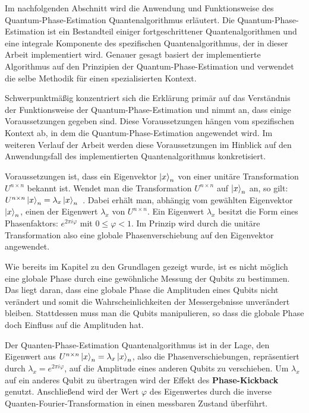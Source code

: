 Im nachfolgenden Abschnitt wird die Anwendung und Funktionsweise des Quantum-Phase-Estimation Quantenalgorithmus erläutert. 
Die Quantum-Phase-Estimation ist ein Bestandteil einiger fortgeschrittener Quantenalgorithmen und eine integrale Komponente des spezifischen Quantenalgorithmus, 
der in dieser Arbeit implementiert wird. 
Genauer gesagt basiert der implementierte Algorithmus auf den Prinzipien der Quantum-Phase-Estimation und verwendet die selbe Methodik für einen spezialisierten Kontext.

Schwerpunktmäßig konzentriert sich die Erklärung primär auf das Verständnis der Funktionsweise der Quantum-Phase-Estimation und nimmt an, dass einige Voraussetzungen gegeben sind. 
Diese Voraussetzungen hängen vom spezifischen Kontext ab, 
in dem die Quantum-Phase-Estimation angewendet wird. 
Im weiteren Verlauf der Arbeit werden diese Voraussetzungen im Hinblick auf den Anwendungsfall des implementierten Quantenalgorithmus konkretisiert.

Voraussetzungen ist, dass ein Eigenvektor \(\ket{x}_n\) von einer unitäre Transformation \(U^{n\times n}\) bekannt ist.
Wendet man die Transformation \(U^{n\times n}\) auf \(\ket{x}_n\) an, 
so gilt: \(U^{n\times n}\ket{x}_n=\lambda_x\ket{x}_n\)~\cite{nielsen_chuang_2010}.
Dabei erhält man, abhängig vom gewählten Eigenvektor \(\ket{x}_n\), einen der Eigenwert \(\lambda_x\) von \(U^{n\times n}\).
Ein Eigenwert \(\lambda_x\) besitzt die Form eines Phasenfaktors: \(e^{2\pi i \varphi}\)
mit \(0 \leq \varphi < 1\).
Im Prinzip wird durch die unitäre Transformation also eine globale Phasenverschiebung auf den Eigenvektor angewendet.

Wie bereits im Kapitel zu den Grundlagen gezeigt wurde, 
ist es nicht möglich eine globale Phase durch eine gewöhnliche Messung der Qubits zu bestimmen. 
Das liegt daran, 
dass eine globale Phase die Amplituden eines Qubits nicht verändert und somit die Wahrscheinlichkeiten der Messergebnisse unverändert bleiben.
Stattdessen muss man die Qubits manipulieren, so dass die globale Phase doch Einfluss auf die Amplituden hat.

Der Quanten-Phase-Estimation Quantenalgorithmus ist in der Lage, 
den Eigenwert aus \(U^{n\times n}\ket{x}_n=\lambda_x\ket{x}_n\), also die Phasenverschiebungen, repräsentiert durch \(\lambda_x = e^{2\pi i \varphi}\),
auf die Amplitude eines anderen Qubits zu verschieben.
Um \(\lambda_x\) auf ein anderes Qubit zu übertragen wird der Effekt des \textbf{Phase-Kickback} genutzt.
Anschließend wird der Wert \(\varphi\) des Eigenwertes durch die inverse Quanten-Fourier-Transformation in einen messbaren Zustand überführt.

